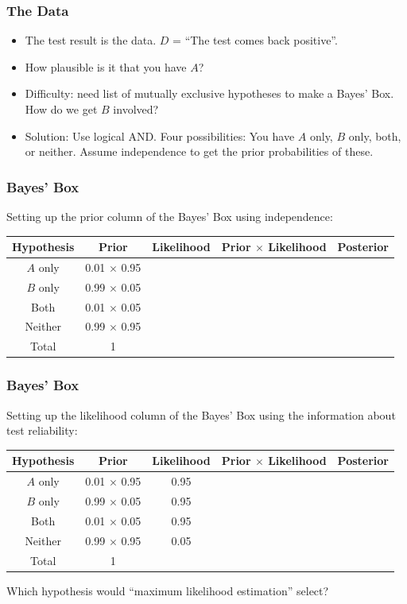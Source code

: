 \documentclass{beamer}
\begin{document}
\begin{frame}
\frametitle{The Data}

\begin{itemize}
\item The test result is the data. $D$ = ``The test comes back positive''.\pause
\item How plausible is it that you have $A$? \pause
\item Difficulty: need list of mutually exclusive hypotheses
        to make a Bayes' Box. How do we get $B$ involved? \pause
\item Solution: Use logical AND. Four possibilities:
        You have $A$ only, $B$ only, both, or neither.
        Assume independence to get the prior
        probabilities of these.
\end{itemize}

\end{frame}




\begin{frame}
\frametitle{Bayes' Box}
Setting up the prior column of the Bayes' Box using independence:
\vspace{1em}

\begin{tabular}{|c|c|c|c|c|}
\hline
Hypothesis & Prior & Likelihood & Prior $\times$ Likelihood & Posterior \\
\hline
$A$ only & 0.01 $\times$ 0.95 & & & \\
$B$ only & 0.99 $\times$ 0.05 & & & \\
Both     & 0.01 $\times$ 0.05 & & & \\
Neither  & 0.99 $\times$ 0.95 & & & \\
\hline
Total & 1 & & & \\
\hline
\end{tabular}


\end{frame}


\begin{frame}
\frametitle{Bayes' Box}
Setting up the likelihood column of the Bayes' Box using the information
about test reliability:
\vspace{1em}

\begin{tabular}{|c|c|c|c|c|}
\hline
Hypothesis & Prior & Likelihood & Prior $\times$ Likelihood & Posterior \\
\hline
$A$ only & 0.01 $\times$ 0.95 & 0.95 & & \\
$B$ only & 0.99 $\times$ 0.05 & 0.95 & & \\
Both     & 0.01 $\times$ 0.05 & 0.95 & & \\
Neither  & 0.99 $\times$ 0.95 & 0.05 & & \\
\hline
Total & 1 & & & \\
\hline
\end{tabular}

\pause
\vspace{0.3em}
Which hypothesis would ``maximum likelihood estimation''
select?


\end{frame}
\end{document}
